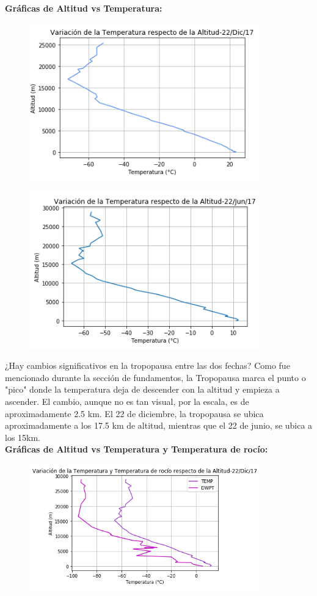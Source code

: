 \documentclass[a4paper]{article}
\begin{document}
\newpage
\textbf{Gráficas de Altitud vs Temperatura:}

\begin{figure}[h!]
  \includegraphics[width=10cm]{graf3.png}
  \centering
  \label{fig:7}
\end{figure}

\begin{figure}[h!]
  \includegraphics[width=10cm]{graf4.png}
  \centering
  \label{fig:8}
\end{figure}

¿Hay cambios significativos en la tropopausa entre las dos fechas? Como fue mencionado durante la sección de fundamentos, la Tropopausa marca el punto o "pico" donde la temperatura deja de descender con la altitud y empieza a ascender. El cambio, aunque no es tan visual, por la escala, es de aproximadamente 2.5 km. El 22 de diciembre, la tropopausa se ubica aproximadamente a los 17.5 km de altitud, mientras que el 22 de junio, se ubica a los 15km. \\

\textbf{Gráficas de Altitud vs Temperatura y Temperatura de rocío:}

\begin{figure}[h!]
  \includegraphics[width=10cm]{graf5.png}
  \centering
  \label{fig:9}
\end{figure}
\end{document}
